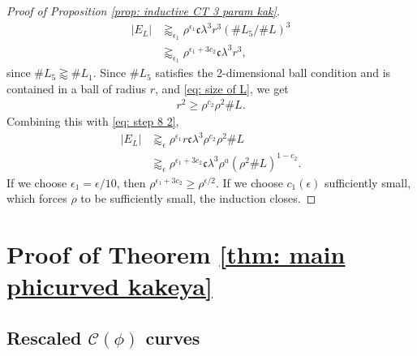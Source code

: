 \documentclass[12pt]{amsart}
\numberwithin{equation}{section}
\newcommand{\1}{\mathbbm{1}}
\begin{document}
\begin{proof}[Proof of Proposition \ref{prop: inductive CT 3 param kak}]
    \begin{align} 
        |E_L| &\gtrapprox_{\epsilon_1} \rho^{\epsilon_1} \mathfrak c \lambda^3 r^3 (\# L_5/\#L)^3 \\
        &\gtrapprox_{\epsilon_1} \rho^{\epsilon_1 + 3c_2} \mathfrak{c} \lambda^3 r^3,
        \label{eq: step 8 2}
    \end{align}
    since $\# L_5 \gtrapprox \# L_1$. Since $\# L_5$ satisfies the 2-dimensional ball condition and is contained in a ball of radius $r$, and \eqref{eq: size of L}, we get 
    \begin{align}
        r^2 \geq \rho^{c_2} \rho^2 \# L. 
    \end{align}
    Combining this with \eqref{eq: step 8 2},
    \begin{align}
        |E_L| &\gtrapprox_\epsilon \rho^{\epsilon_1} r \mathfrak c \lambda^3 \rho^{c_2} \rho^2 \# L \\
        &\gtrapprox_\epsilon \rho^{\epsilon_1 + 3 c_2} \mathfrak c \lambda^3 \rho^a (\rho^2 \# L)^{1-c_2}.
    \end{align}
    If we choose $\epsilon_1 = \epsilon / 10$, then $\rho^{\epsilon_1 + 3 c_2} \geq \rho^{\epsilon / 2}$. If we choose $c_1(\epsilon)$ sufficiently small, which forces $\rho$ to be sufficiently small, the induction closes.
\end{proof}



\section{Proof of Theorem \ref{thm: main phicurved kakeya}}\label{sec: 7}

\subsection{Rescaled $\mathcal C(\phi)$ curves}
\end{document}
